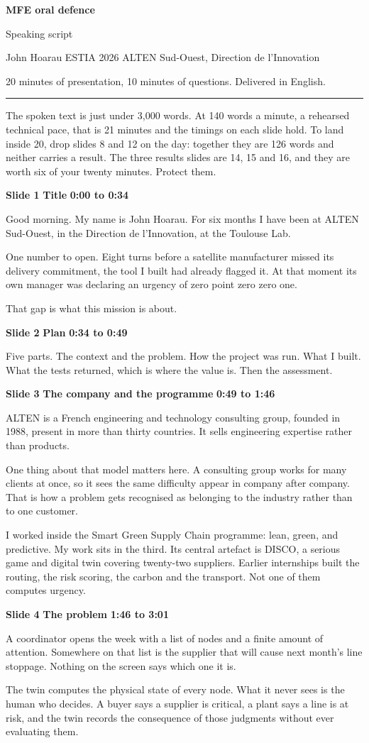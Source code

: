 \documentclass[a4paper,12pt]{article}
\newcommand{\SlideHeading}[3]{%
  \needspace{4\baselineskip}%
  \vspace{10pt}%
  \noindent\colorbox{altenBlueBg}{%
    \parbox{\dimexpr\linewidth-2\fboxsep}{%
      \vspace{3pt}%
      \textbf{\large\color{altenNavy}#1}\quad
      \textbf{\large\color{altenAzureDark}#2}%
      \hfill\textbf{\color{altenAzure}#3}%
      \vspace{3pt}}}%
  \vspace{5pt}\par}
\newcommand{\TitleBlock}{%
  {\noindent\Huge\bfseries\color{altenNavy}MFE oral defence\par}
  \vspace{4pt}
  {\noindent\Large\color{altenAzureDark}Speaking script\par}
  \vspace{10pt}
  {\noindent\color{altenNavy}John Hoarau \textperiodcentered{} ESTIA 2026 \textperiodcentered{}
   ALTEN Sud-Ouest, Direction de l'Innovation\par}
  {\noindent\color{altenNavy}20 minutes of presentation, 10 minutes of questions.
   Delivered in English.\par}
  \vspace{6pt}
  {\noindent\color{altenAzure}\rule{\linewidth}{1pt}\par}
  \vspace{8pt}\par}
\begin{document}
\TitleBlock
The spoken text is just under 3,000 words. At 140 words a minute, a rehearsed technical pace, that is 21 minutes and the timings on each slide hold. To land inside 20, drop slides 8 and 12 on the day: together they are 126 words and neither carries a result. The three results slides are 14, 15 and 16, and they are worth six of your twenty minutes. Protect them.

\SlideHeading{Slide 1}{Title}{0:00 to 0:34}
Good morning. My name is John Hoarau. For six months I have been at ALTEN Sud-Ouest, in the Direction de l'Innovation, at the Toulouse Lab.

One number to open. Eight turns before a satellite manufacturer missed its delivery commitment, the tool I built had already flagged it. At that moment its own manager was declaring an urgency of zero point zero zero one.

That gap is what this mission is about.

\SlideHeading{Slide 2}{Plan}{0:34 to 0:49}
Five parts. The context and the problem. How the project was run. What I built. What the tests returned, which is where the value is. Then the assessment.

\SlideHeading{Slide 3}{The company and the programme}{0:49 to 1:46}
ALTEN is a French engineering and technology consulting group, founded in 1988, present in more than thirty countries. It sells engineering expertise rather than products.

One thing about that model matters here. A consulting group works for many clients at once, so it sees the same difficulty appear in company after company. That is how a problem gets recognised as belonging to the industry rather than to one customer.

I worked inside the Smart Green Supply Chain programme: lean, green, and predictive. My work sits in the third. Its central artefact is DISCO, a serious game and digital twin covering twenty-two suppliers. Earlier internships built the routing, the risk scoring, the carbon and the transport. Not one of them computes urgency.

\SlideHeading{Slide 4}{The problem}{1:46 to 3:01}
A coordinator opens the week with a list of nodes and a finite amount of attention. Somewhere on that list is the supplier that will cause next month's line stoppage. Nothing on the screen says which one it is.

The twin computes the physical state of every node. What it never sees is the human who decides. A buyer says a supplier is critical, a plant says a line is at risk, and the twin records the consequence of those judgments without ever evaluating them.
\end{document}
